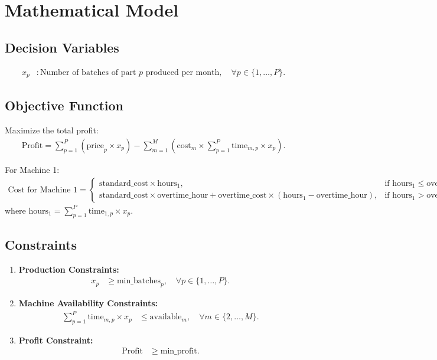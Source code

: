 \documentclass{article}
\begin{document}
\section*{Mathematical Model}

\subsection*{Decision Variables}
\begin{align*}
x_p & : \text{Number of batches of part } p \text{ produced per month}, \quad \forall p \in \{1, \ldots, P\}.
\end{align*}

\subsection*{Objective Function}
Maximize the total profit:
\begin{align*}
\text{Profit} = \sum_{p=1}^{P} \left(\text{price}_p \times x_p \right) - \sum_{m=1}^{M} \left(\text{cost}_m \times \sum_{p=1}^{P} \text{time}_{m,p} \times x_p \right).
\end{align*}

For Machine 1:
\begin{align*}
\text{Cost for Machine 1} = 
\begin{cases} 
\text{standard\_cost} \times \text{hours}_1, & \text{if } \text{hours}_1 \leq \text{overtime\_hour} \\
\text{standard\_cost} \times \text{overtime\_hour} + \text{overtime\_cost} \times (\text{hours}_1 - \text{overtime\_hour}), & \text{if } \text{hours}_1 > \text{overtime\_hour}
\end{cases}
\end{align*}
where $\text{hours}_1 = \sum_{p=1}^{P} \text{time}_{1,p} \times x_p$.

\subsection*{Constraints}
\begin{enumerate}
    \item \textbf{Production Constraints:}
    \begin{align*}
    x_p & \geq \text{min\_batches}_p, \quad \forall p \in \{1, \ldots, P\}.
    \end{align*}
    
    \item \textbf{Machine Availability Constraints:}
    \begin{align*}
    \sum_{p=1}^{P} \text{time}_{m,p} \times x_p & \leq \text{available}_m, \quad \forall m \in \{2, \ldots, M\}.
    \end{align*}

    \item \textbf{Profit Constraint:}
    \begin{align*}
    \text{Profit} & \geq \text{min\_profit}.
    \end{align*}
\end{enumerate}
\end{document}
